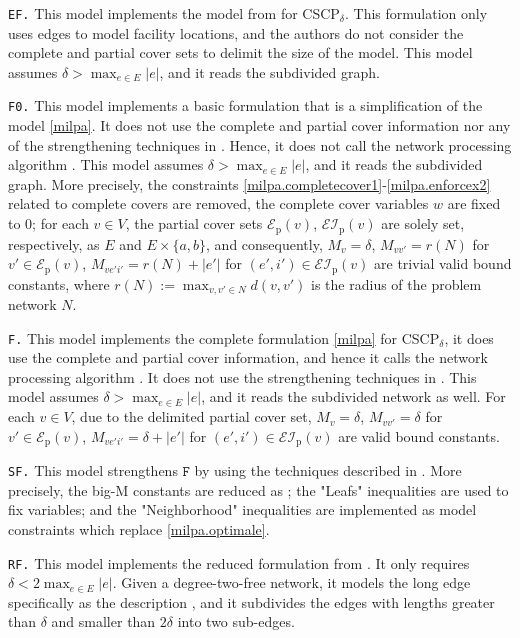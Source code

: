 \documentclass[review]{elsarticle}
\newcommand{\cE}{{\mathcal E}}
\newcommand{\cEI}{{\mathcal {EI}}}
\newcommand{\dlt}{{\delta}}
\newcommand{\problem}{CSCP$_\dlt$}
\newcommand{\ncalgo}{\text{nodeCover}}
\theoremstyle{definition}
\begin{document}
\texttt{EF.} This model implements the model from \cite{Hamacher20} for \problem. This formulation only uses edges to model facility locations, and the authors do not consider the complete and partial cover sets to delimit the size of the model. This model assumes $\dlt > \max_{e \in E}|e|$, and it reads the subdivided graph.

\texttt{F0.} This model implements a  basic formulation that is a simplification of the model \eqref{milpa}. It does not use the complete and partial cover information nor any of the strengthening techniques in . Hence, it does not call the network processing algorithm \ncalgo. This model assumes $\dlt > \max_{e \in E}|e|$, and it reads the subdivided graph. More precisely, the constraints \eqref{milpa.completecover1}-\eqref{milpa.enforcex2} related to complete covers are removed, the complete cover variables $w$ are fixed to $0$; for each $v \in V$, the partial cover sets $\cE_{\mathrm{p}}(v)$, $\cEI_{\mathrm{p}}(v)$ are solely set, respectively, as $E$ and $E \times \{a,b\}$, and consequently, $M_{v} = \dlt$, $M_{vv'} = r(N)$ for $v' \in \cE_{\mathrm{p}}(v)$, $M_{ve'i'} = r(N) + |e'|$ for $(e',i') \in \cEI_{\mathrm{p}}(v)$ are trivial valid bound constants, where $r(N):= \max_{v,v' \in N} d(v,v')$ is the radius of the problem network $N$.

\texttt{F.}  This model implements the complete formulation \eqref{milpa} for \problem, it does use the complete and partial cover information, and hence it  calls the network processing algorithm \ncalgo.  It does not use the strengthening techniques in . This model assumes $\dlt > \max_{e \in E}|e|$, and it reads the subdivided network as well.  For each $v \in V$, due to the delimited partial cover set,  $M_{v} = \dlt$, $M_{vv'} = \dlt$ for $v' \in \cE_{\mathrm{p}}(v)$, $M_{ve'i'} = \dlt + |e'|$ for $(e',i') \in \cEI_{\mathrm{p}}(v)$ are valid bound constants.

\texttt{SF.} This model strengthens  $\texttt{F}$ by using the techniques described in . %
More precisely, the big-M constants are reduced as ; the "Leafs" inequalities are used to fix variables; and the "Neighborhood" inequalities are implemented as model constraints which replace \eqref{milpa.optimale}.

\texttt{RF.} This model implements the reduced formulation from . It only requires $\dlt < 2\max_{e \in E}|e|$. Given a degree-two-free network, it models the long edge specifically as the description , and it subdivides the edges with lengths greater than $\dlt$ and smaller than $2\dlt$ into two sub-edges.
\end{document}
